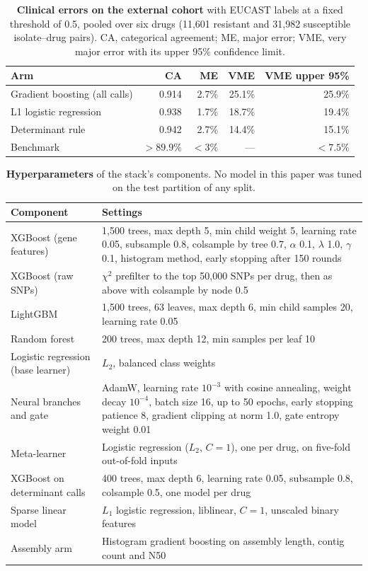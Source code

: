 \begin{table}[t]\centering\small
\caption{\textbf{Clinical errors on the external cohort} with EUCAST labels at a fixed threshold of
0.5, pooled over six drugs (11,601 resistant and 31,982 susceptible isolate--drug pairs). CA,
categorical agreement; ME, major error; VME, very major error with its upper 95\% confidence limit.}
\label{tab:clinical}
\begin{tabular}{lrrrr}
\toprule
Arm & CA & ME & VME & VME upper 95\% \\
\midrule
Gradient boosting (all calls) & 0.914 & 2.7\% & 25.1\% & 25.9\% \\
L1 logistic regression        & 0.938 & 1.7\% & 18.7\% & 19.4\% \\
Determinant rule              & 0.942 & 2.7\% & 14.4\% & 15.1\% \\
\midrule
Benchmark \cite{fda2009ast} & $> 89.9\%$ & $< 3\%$ & --- & $< 7.5\%$ \\
\bottomrule
\end{tabular}
\end{table}

\begin{table}[t]\centering\small
\caption{\textbf{Hyperparameters} of the stack's components. No model in this paper was tuned on
the test partition of any split.}\label{tab:hyper}
\begin{tabularx}{\linewidth}{lX}
\toprule
Component & Settings \\
\midrule
XGBoost (gene features) & 1,500 trees, max depth 5, min child weight 5, learning rate 0.05, subsample 0.8, colsample by tree 0.7, $\alpha$ 0.1, $\lambda$ 1.0, $\gamma$ 0.1, histogram method, early stopping after 150 rounds \\
XGBoost (raw SNPs) & $\chi^2$ prefilter to the top 50,000 SNPs per drug, then as above with colsample by node 0.5 \\
LightGBM & 1,500 trees, 63 leaves, max depth 6, min child samples 20, learning rate 0.05 \\
Random forest & 200 trees, max depth 12, min samples per leaf 10 \\
Logistic regression (base learner) & $L_2$, balanced class weights \\
Neural branches and gate & AdamW, learning rate $10^{-3}$ with cosine annealing, weight decay $10^{-4}$, batch size 16, up to 50 epochs, early stopping patience 8, gradient clipping at norm 1.0, gate entropy weight 0.01 \\
Meta-learner & Logistic regression ($L_2$, $C = 1$), one per drug, on five-fold out-of-fold inputs \\
XGBoost on determinant calls & 400 trees, max depth 6, learning rate 0.05, subsample 0.8, colsample 0.5, one model per drug \\
Sparse linear model & $L_1$ logistic regression, liblinear, $C = 1$, unscaled binary features \\
Assembly arm & Histogram gradient boosting on assembly length, contig count and N50 \\
\bottomrule
\end{tabularx}
\end{table}

